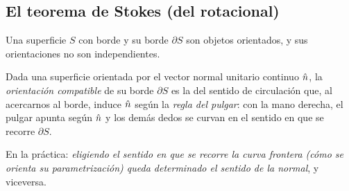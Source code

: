 

\subsection{El teorema de Stokes (del rotacional)}\label{sec:stokes}
Una superficie $S$ con borde y su borde $\partial S$ son objetos orientados, y
sus orientaciones no son independientes.

\begin{definicion}\label{def:orientacion-compatible}
Dada una superficie orientada por el vector normal unitario continuo $\hat{n}$, la
\emph{orientación compatible} de su borde $\partial S$ es la del sentido de
circulación que, al acercarnos al borde, induce $\hat{n}$ según la \emph{regla del
pulgar}: con la mano derecha, el pulgar apunta según $\hat{n}$ y los demás dedos se
curvan en el sentido en que se recorre $\partial S$.
\end{definicion}

En la práctica: \emph{eligiendo el sentido en que se recorre la curva frontera
(cómo se orienta su parametrización) queda determinado el sentido de la normal}, y
viceversa.

